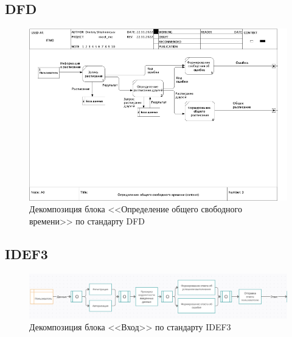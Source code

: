 \documentclass[aspectratio=169]{beamer}
\begin{document}
\subsection{DFD}
\begin{frame}
    \begin{figure}
        \includegraphics[scale=.35]{img/DFD2.png}
        \caption{Декомпозиция блока <<Определение общего свободного времени>> по стандарту DFD}
    \end{figure}
\end{frame}
\subsection{IDEF3}
\begin{frame}
    \begin{figure}
        \includegraphics[scale=.4]{img/IDEF3-2-0.png}
        \caption{Декомпозиция блока <<Вход>> по стандарту IDEF3}
    \end{figure}
\end{frame}
\end{document}
